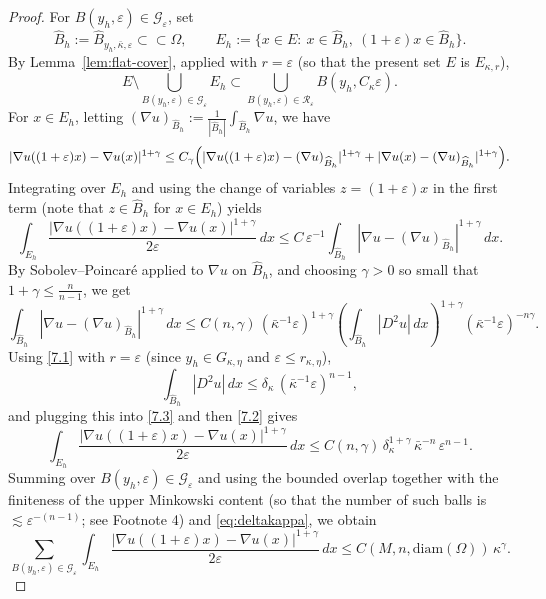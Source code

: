 \documentclass[10pt,a4paper]{amsart}
\begin{document}
\begin{proof}
{For $B(y_h,\varepsilon)\in\mathcal G_\varepsilon$, set}
\[
{
\widehat B_h:=\widehat B_{y_h,\bar\kappa,\varepsilon}\subset\subset\Omega,\qquad
E_h:=\{x\in E:\ x\in \widehat B_h,\ (1+\varepsilon)x\in \widehat B_h\}.
}
\]
{By Lemma~\ref{lem:flat-cover}, applied with $r=\varepsilon$ (so that the present set $E$ is $E_{\kappa,r}$),}
\[
{
E\setminus\bigcup_{B(y_h,\varepsilon)\in\mathcal G_\varepsilon}E_h
\subset
\bigcup_{B(y_h,\varepsilon)\in\mathcal R_\varepsilon}B(y_h,C_\kappa\varepsilon).
}
\]
		{For $x\in E_h$, letting $(\nabla u)_{\widehat B_h}:=\frac{1}{|\widehat B_h|}\int_{\widehat B_h}\nabla u$,
		we have}
\[
|\nabla u((1+\varepsilon)x)-\nabla u(x)|^{1+\gamma}
\le C_\gamma\Bigl(|\nabla u((1+\varepsilon)x)-(\nabla u)_{\widehat B_h}|^{1+\gamma}
+|\nabla u(x)-(\nabla u)_{\widehat B_h}|^{1+\gamma}\Bigr).
\]
Integrating over $E_h$ and using the change of variables $z=(1+\varepsilon)x$ in the first term
(note that $z\in\widehat B_h$ for $x\in E_h$) yields
\begin{equation}\label{7.2}
\int_{E_h}\frac{|\nabla u((1+\varepsilon)x)-\nabla u(x)|^{1+\gamma}}{2\varepsilon}\,dx
\le C\,\varepsilon^{-1}\int_{\widehat B_h}|\nabla u-(\nabla u)_{\widehat B_h}|^{1+\gamma}\,dx.
\end{equation}
By Sobolev--Poincar\'e applied to $\nabla u$ on $\widehat B_h$, and choosing
$\gamma>0$ so small that $1+\gamma\le \frac{n}{n-1}$, we get
\begin{equation}\label{7.3}
\int_{\widehat B_h}|\nabla u-(\nabla u)_{\widehat B_h}|^{1+\gamma}\,dx
\le {C(n,\gamma)\,(\bar\kappa^{-1}\varepsilon)^{1+\gamma}
\left(\int_{\widehat B_h}|D^2u|\,dx\right)^{1+\gamma}(\bar\kappa^{-1}\varepsilon)^{-n\gamma}.}
\end{equation}
Using \eqref{7.1} with $r=\varepsilon$ (since $y_h\in G_{\kappa,\eta}$ and $\varepsilon\le r_{\kappa,\eta}$),
\[
{
\int_{\widehat B_h}|D^2u|\,dx \le \delta_\kappa\,(\bar\kappa^{-1}\varepsilon)^{n-1},
}
\]
and plugging this into \eqref{7.3} and then \eqref{7.2} gives
\[
{
\int_{E_h}\frac{|\nabla u((1+\varepsilon)x)-\nabla u(x)|^{1+\gamma}}{2\varepsilon}\,dx
\le C(n,\gamma)\,\delta_\kappa^{1+\gamma}\,\bar\kappa^{-n}\,\varepsilon^{n-1}.
}
\]
{Summing over $B(y_h,\varepsilon)\in\mathcal G_\varepsilon$} and using the bounded overlap together with
the finiteness of the upper Minkowski content (so that the number of such balls is
{$\lesssim \varepsilon^{-(n-1)}$; see Footnote 4}) and \eqref{eq:deltakappa}, we obtain
\begin{equation}\label{2.8}
\sum_{B(y_h,\varepsilon)\in\mathcal G_\varepsilon}
\int_{E_h}\frac{|\nabla u((1+\varepsilon)x)-\nabla u(x)|^{1+\gamma}}{2\varepsilon}\,dx
\le {C(M,n,\mathrm{diam}(\Omega))\,\kappa^\gamma.}
\end{equation}


\end{proof}
\end{document}
